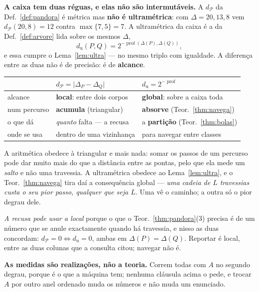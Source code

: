 \documentclass[11pt,a4paper]{article}
\begin{document}
\medskip\noindent\textbf{A caixa tem duas réguas, e elas não são intermutáveis.}
A $d_{\mathcal{P}}$ da Def.~\ref{def:pandora} é métrica mas \textbf{não é
ultramétrica}: com $\Delta=20,13,8$ vem $d_{\mathcal{P}}(20,8)=12$ contra
$\max\{7,5\}=7$. A ultramétrica da caixa é a da Def.~\ref{def:arvore} lida sobre
os mesmos $\Delta$,
\[
d_{\mathrm{u}}(P,Q)=2^{-\operatorname{prof}(\Delta(P),\Delta(Q))},
\]
e essa cumpre o Lema~\ref{lem:ultra} --- no mesmo triplo com igualdade. A
diferença entre as duas não é de precisão: é de \textbf{alcance}.
\begin{center}\footnotesize
\begin{tabular}{@{}lll@{}}
\toprule
 & $d_{\mathcal{P}}=\lvert\Delta_P-\Delta_Q\rvert$ & $d_{\mathrm{u}}=2^{-\operatorname{prof}}$ \\
\midrule
alcance & \textbf{local}: entre dois corpos & \textbf{global}: sobre a caixa toda \\
num percurso & \textbf{acumula} (triangular) & \textbf{absorve} (Teor.~\ref{thm:navega}) \\
o que dá & \emph{quanto} falta --- a recusa & a \textbf{partição} (Teor.~\ref{thm:bolas}) \\
onde se usa & dentro de uma vizinhança & para navegar entre classes \\
\bottomrule
\end{tabular}
\end{center}

\noindent A aritmética obedece à triangular e mais nada: somar os passos de um
percurso pode dar muito mais do que a distância entre as pontas, pelo que ela
mede um \emph{salto} e não uma travessia. A ultramétrica obedece ao
Lema~\ref{lem:ultra}, e o Teor.~\ref{thm:navega} tira daí a consequência global
--- \emph{uma cadeia de $L$ travessias custa o seu pior passo, qualquer que seja
$L$}. Uma vê o caminho; a outra só o pior degrau dele.

\noindent \emph{A recusa pode usar a local} porque o que o
Teor.~\ref{thm:pandora}(3) precisa é de um número que se anule exactamente quando
há travessia, e nisso as duas concordam: $d_{\mathcal{P}}=0\iff d_{\mathrm{u}}=0$,
ambas em $\Delta(P)=\Delta(Q)$. Reportar é local, entre as duas colunas que a
consulta citou; navegar não é.

\medskip\noindent\textbf{As medidas são realizações, não a teoria.} Correm todas
com $A$ no segundo degrau, porque é o que a máquina tem; nenhuma cláusula acima o
pede, e trocar $A$ por outro anel ordenado muda os números e não muda um enunciado.
\end{document}

